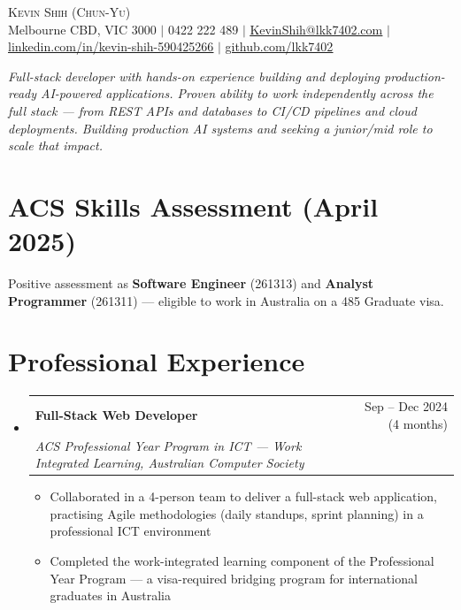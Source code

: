 \documentclass[letterpaper,10pt]{article}
\makeatletter
\newcommand{\resumeItem}[1]{
  \item\small{#1 \vspace{-2pt}}
}
\newcommand{\resumeSubheading}[4]{
  \vspace{-2pt}\item
    \begin{tabular*}{0.97\textwidth}[t]{l@{\extracolsep{\fill}}r}
      \textbf{#1} & #2 \\
      \textit{\small#3} & \textit{\small #4} \\
    \end{tabular*}\vspace{-7pt}
}
\newcommand{\resumeSubHeadingListStart}{\begin{itemize}[leftmargin=0.15in, label={}]}
\newcommand{\resumeSubHeadingListEnd}{\end{itemize}}
\newcommand{\resumeItemListStart}{\begin{itemize}}
\newcommand{\resumeItemListEnd}{\end{itemize}\vspace{-5pt}}
\makeatother
\begin{document}
\begin{center}
  {\Huge \scshape Kevin Shih (Chun-Yu)} \\ \vspace{4pt}
  \small Melbourne CBD, VIC 3000 $|$
  0422 222 489 $|$
  \href{mailto:KevinShih@lkk7402.com}{\underline{KevinShih@lkk7402.com}} $|$
  \href{https://linkedin.com/in/kevin-shih-590425266}{\underline{linkedin.com/in/kevin-shih-590425266}} $|$
  \href{https://github.com/lkk7402}{\underline{github.com/lkk7402}}
\end{center}

\vspace{-6pt}
\begin{center}
  \small\textit{Full-stack developer with hands-on experience building and deploying production-ready AI-powered
  applications. Proven ability to work independently across the full stack — from REST APIs and databases to CI/CD
  pipelines and cloud deployments. Building production AI systems and seeking a junior/mid role to scale that impact.}
\end{center}

\section{ACS Skills Assessment (April 2025)}
Positive assessment as \textbf{Software Engineer} (261313) and \textbf{Analyst Programmer} (261311) — eligible to work in Australia on a 485 Graduate visa.

\section{Professional Experience}
\resumeSubHeadingListStart

  \resumeSubheading
    {Full-Stack Web Developer}{Sep -- Dec 2024 (4 months)}
    {ACS Professional Year Program in ICT --- Work Integrated Learning, Australian Computer Society}{}
    \resumeItemListStart
      \resumeItem{Collaborated in a 4-person team to deliver a full-stack web application, practising Agile methodologies (daily standups, sprint planning) in a professional ICT environment}
      \resumeItem{Completed the work-integrated learning component of the Professional Year Program --- a visa-required bridging program for international graduates in Australia}
    \resumeItemListEnd

\resumeSubHeadingListEnd
\end{document}
